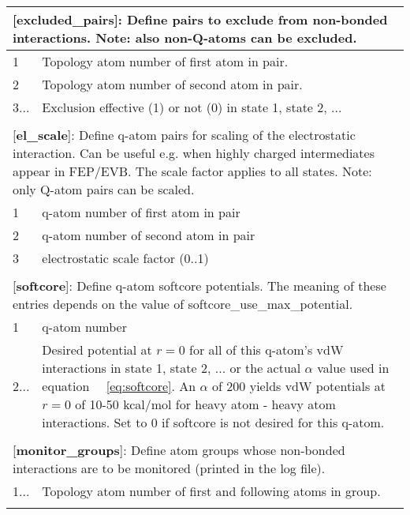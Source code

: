 \documentclass[a4paper,11pt]{article}
\let\origref\ref
\def\ref#1{\unskip~\origref{#1}}
\begin{document}
\begin{longtable}{|p{53pt}|p{181pt}|p{160pt}|}
\multicolumn{3}{p{394pt}}{[\textbf{excluded\_pairs}]: Define pairs to exclude from non-bonded interactions. Note: also non-Q-atoms can be excluded.}\\
\hline 1 & \multicolumn{2}{p{341pt}|}{Topology atom number of first atom in pair.}\\
\hline 2 & \multicolumn{2}{p{341pt}|}{Topology atom number of second atom in pair.}\\
\hline 3... & \multicolumn{2}{p{341pt}|}{Exclusion effective (1) or not (0) in state 1, state 2, ...}\\
\hline
\multicolumn{3}{p{394pt}}{}\\

\multicolumn{3}{p{394pt}}{[\textbf{el\_scale}]: Define q-atom pairs for scaling of the electrostatic interaction. Can be useful e.g. when highly charged intermediates appear in FEP/EVB. The scale factor applies to all states. Note: only Q-atom pairs can be scaled.}\\
\hline 1 & \multicolumn{2}{p{341pt}|}{q-atom number of first atom in pair}\\
\hline 2 & \multicolumn{2}{p{341pt}|}{q-atom number of second atom in pair}\\
\hline 3 & \multicolumn{2}{p{341pt}|}{electrostatic scale factor (0..1)}\\
\hline
\multicolumn{3}{p{394pt}}{}\\

\multicolumn{3}{p{394pt}}{[\textbf{softcore}]: Define q-atom softcore potentials. The meaning of these entries depends on the value of softcore\-\_use\-\_max\-\_potential.}\\
\hline 1 & \multicolumn{2}{p{341pt}|}{q-atom number}\\
\hline 2... & \multicolumn{2}{p{341pt}|}{Desired potential at $r=0$ for all of this q-atom's vdW interactions in state 1, state 2, ... or the actual $\alpha$ value used in equation \ref{eq:softcore}. An $\alpha$ of 200 yields vdW potentials at $r=0$ of 10-50 kcal/mol for heavy atom - heavy atom interactions. Set to 0 if softcore is not desired for this q-atom. }\\
\hline
\multicolumn{3}{p{394pt}}{}\\

\multicolumn{3}{p{394pt}}{[\textbf{monitor\_groups}]: Define atom groups whose non-bonded interactions are to be monitored (printed in the log file).}\\
\hline 1... & \multicolumn{2}{p{341pt}|}{Topology atom number of first and following atoms in group.}\\
\hline
\multicolumn{3}{p{394pt}}{}\\


\end{longtable}
\end{document}

